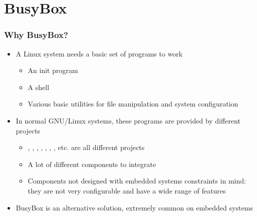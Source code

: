 \section{BusyBox}

\begin{frame}
  \frametitle{Why BusyBox?}
  \begin{itemize}
  \item A Linux system needs a basic set of programs to work
    \begin{itemize}
    \item An init program
    \item A shell
    \item Various basic utilities for file manipulation and system
      configuration
    \end{itemize}
  \item In normal GNU/Linux systems, these programs are provided by
    different projects
    \begin{itemize}
    \item {}, , , ,
      , , , etc. are all different
      projects
    \item A lot of different components to integrate
    \item Components not designed with embedded systems constraints in
      mind: they are not very configurable and have a wide range of
      features
    \end{itemize}
  \item BusyBox is an alternative solution, extremely common on
    embedded systems
  \end{itemize}
\end{frame}

